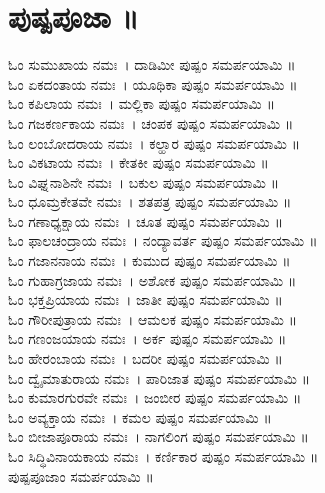 \section{ಪುಷ್ಪಪೂಜಾ ॥}
ಓಂ ಸುಮುಖಾಯ ನಮಃ~। ದಾಡಿಮೀ ಪುಷ್ಪಂ ಸಮರ್ಪಯಾಮಿ ॥\\
ಓಂ ಏಕದಂತಾಯ ನಮಃ~। ಯೂಥಿಕಾ ಪುಷ್ಪಂ ಸಮರ್ಪಯಾಮಿ ॥\\
ಓಂ ಕಪಿಲಾಯ ನಮಃ~। ಮಲ್ಲಿಕಾ ಪುಷ್ಪಂ ಸಮರ್ಪಯಾಮಿ ॥\\
ಓಂ ಗಜಕರ್ಣಕಾಯ ನಮಃ~। ಚಂಪಕ ಪುಷ್ಪಂ ಸಮರ್ಪಯಾಮಿ ॥\\
ಓಂ ಲಂಬೋದರಾಯ ನಮಃ~। ಕಲ್ಹಾರ ಪುಷ್ಪಂ ಸಮರ್ಪಯಾಮಿ ॥\\
ಓಂ ವಿಕಟಾಯ ನಮಃ~। ಕೇತಕೀ ಪುಷ್ಪಂ ಸಮರ್ಪಯಾಮಿ ॥\\
ಓಂ ವಿಘ್ನನಾಶಿನೇ ನಮಃ~। ಬಕುಲ ಪುಷ್ಪಂ ಸಮರ್ಪಯಾಮಿ ॥\\
ಓಂ ಧೂಮ್ರಕೇತವೇ ನಮಃ~। ಶತಪತ್ರ ಪುಷ್ಪಂ ಸಮರ್ಪಯಾಮಿ ॥\\
ಓಂ ಗಣಾಧ್ಯಕ್ಷಾಯ ನಮಃ~। ಚೂತ ಪುಷ್ಪಂ ಸಮರ್ಪಯಾಮಿ ॥\\
ಓಂ ಫಾಲಚಂದ್ರಾಯ ನಮಃ~। ನಂದ್ಯಾವರ್ತ ಪುಷ್ಪಂ ಸಮರ್ಪಯಾಮಿ ॥\\
ಓಂ ಗಜಾನನಾಯ ನಮಃ~। ಕುಮುದ ಪುಷ್ಪಂ ಸಮರ್ಪಯಾಮಿ ॥\\
ಓಂ ಗುಹಾಗ್ರಜಾಯ ನಮಃ~। ಅಶೋಕ ಪುಷ್ಪಂ ಸಮರ್ಪಯಾಮಿ ॥\\
ಓಂ ಭಕ್ತಪ್ರಿಯಾಯ ನಮಃ~। ಜಾತೀ ಪುಷ್ಪಂ ಸಮರ್ಪಯಾಮಿ ॥\\
ಓಂ ಗೌರೀಪುತ್ರಾಯ ನಮಃ~। ಆಮಲಕ ಪುಷ್ಪಂ ಸಮರ್ಪಯಾಮಿ ॥\\
ಓಂ ಗಣಂಜಯಾಯ ನಮಃ~। ಅರ್ಕ ಪುಷ್ಪಂ ಸಮರ್ಪಯಾಮಿ ॥\\
ಓಂ ಹೇರಂಬಾಯ ನಮಃ~। ಬದರೀ ಪುಷ್ಪಂ ಸಮರ್ಪಯಾಮಿ ॥\\
ಓಂ ದ್ವೈಮಾತುರಾಯ ನಮಃ~। ಪಾರಿಜಾತ ಪುಷ್ಪಂ ಸಮರ್ಪಯಾಮಿ ॥\\
ಓಂ ಕುಮಾರಗುರವೇ ನಮಃ~। ಜಂಬೀರ ಪುಷ್ಪಂ ಸಮರ್ಪಯಾಮಿ ॥\\
ಓಂ ಅವ್ಯಕ್ತಾಯ ನಮಃ~। ಕಮಲ ಪುಷ್ಪಂ ಸಮರ್ಪಯಾಮಿ ॥\\
ಓಂ ಬೀಜಾಪೂರಾಯ ನಮಃ~। ನಾಗಲಿಂಗ ಪುಷ್ಪಂ ಸಮರ್ಪಯಾಮಿ ॥\\
ಓಂ ಸಿದ್ಧಿವಿನಾಯಕಾಯ ನಮಃ~। ಕರ್ಣಿಕಾರ ಪುಷ್ಪಂ ಸಮರ್ಪಯಾಮಿ ॥\\
ಪುಷ್ಪಪೂಜಾಂ ಸಮರ್ಪಯಾಮಿ ॥
